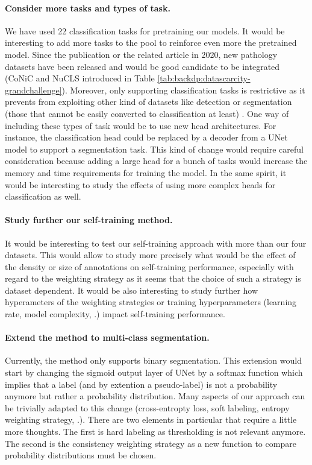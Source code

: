 \paragraph{Consider more tasks and types of task.} We have used 22 classification tasks for pretraining our models. It would be interesting to add more tasks to the pool to reinforce even more the pretrained model. Since the publication or the related article in 2020, new pathology datasets have been released and would be good candidate to be integrated (\eg CoNiC and NuCLS introduced in Table \ref{tab:backdp:datascarcity-grandchallenge}).  Moreover, only supporting classification tasks is restrictive as it prevents from exploiting other kind of datasets like detection or segmentation (those that cannot be easily converted to classification at least) . One way of including these types of task would be to use new head architectures. For instance, the classification head could be replaced by a decoder from a UNet model to support a segmentation task. This kind of change would require careful consideration because adding a large head for a bunch of tasks would increase the memory and time requirements for training the model. In the same spirit, it would be interesting to study the effects of using more complex heads for classification as well.  

\paragraph{Study further our self-training method.} It would be interesting to test our self-training approach with more than our four datasets. This would allow to study more precisely what would be the effect of the density or size of annotations on self-training performance, especially with regard to the weighting strategy as it seems that the choice of such a strategy is dataset dependent. It would be also interesting to study further how hyperameters of the weighting strategies or training hyperparameters (\eg learning rate, model complexity, \etc.) impact self-training performance.

\paragraph{Extend the method to multi-class segmentation.} Currently, the method only supports binary segmentation. This extension would start by changing the sigmoid output layer of UNet by a softmax function which implies that a label (and by extention a pseudo-label) is not a probability anymore but rather a probability distribution. Many aspects of our approach can be trivially adapted to this change (cross-entropty loss, soft labeling, entropy weighting strategy, \etc.). There are two elements in particular that require a little more thoughts. The first is hard labeling as thresholding is not relevant anymore. The second is the consistency weighting strategy as a new function to compare probability distributions must be chosen.      

